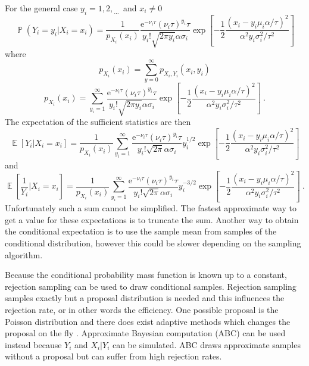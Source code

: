 \documentclass[12pt]{report}
\DeclareMathOperator{\expectation}{\mathbb{E}}
\DeclareMathOperator{\prob}{\mathbb{P}}
\newcommand{\euler}{\mathrm{e}}
\newcommand{\dotdotdot}{_{\phantom{.}\cdots}}
\begin{document}
For the general case $y_i=1,2,\dotdotdot$ and $x_i\neq0$
\begin{equation}
\prob\left(Y_i=y_i|X_i=x_i\right)=\frac{1}{p_{X_i}(x_i)}\dfrac{\euler^{-\nu_i\tau}(\nu_i\tau)^{y_i}\tau}{y_i!\sqrt{2\pi y_i}\alpha\sigma_i}
\exp\left[-\dfrac{1}{2}\dfrac{\left(x_i-y_i\mu_i\alpha/\tau\right)^2}{\alpha^2y_i\sigma_i^2/\tau^2}\right]
\end{equation}
where
\begin{equation*}
p_{X_i}(x_i)=\sum_{y=0}^{\infty}p_{X_i,Y_i}(x_i,y_i)
\end{equation*}
\begin{equation}
p_{X_i}(x_i)=\sum_{y_i=1}^{\infty}\dfrac{\euler^{-\nu_i\tau}(\nu_i\tau)^{y_i}\tau}{y_i!\sqrt{2\pi y_i}\alpha\sigma_i}
\exp\left[-\dfrac{1}{2}\dfrac{\left(x_i-y_i\mu_i\alpha/\tau\right)^2}{\alpha^2y_i\sigma_i^2/\tau^2}\right] \ .
\end{equation}
The expectation of the sufficient statistics are then
\begin{equation}
\expectation\left[Y_i|X_i=x_i\right]=
\frac{1}{p_{X_i}(x_i)}
\sum_{y_i=1}^{\infty}\dfrac{\euler^{-\nu_i\tau}(\nu_i\tau)^{y_i}\tau}{y_i!\sqrt{2\pi}\alpha\sigma_i}y_i^{1/2}
\exp\left[-\dfrac{1}{2}\dfrac{\left(x_i-y_i\mu_i\alpha/\tau\right)^2}{\alpha^2y_i\sigma_i^2/\tau^2}\right]
\end{equation}
and
\begin{equation}
\expectation\left[\dfrac{1}{Y_i}|X_i=x_i\right]=
\frac{1}{p_{X_i}(x_i)}
\sum_{y_i=1}^{\infty}\dfrac{\euler^{-\nu_i\tau}(\nu_i\tau)^{y_i}\tau}{y_i!\sqrt{2\pi}\alpha\sigma_i}y_i^{-3/2}
\exp\left[-\dfrac{1}{2}\dfrac{\left(x_i-y_i\mu_i\alpha/\tau\right)^2}{\alpha^2y_i\sigma_i^2/\tau^2}\right] \ .
\end{equation}
Unfortunately such a sum cannot be simplified. The fastest approximate way to get a value for these expectations is to truncate the sum. Another way to obtain the conditional expectation is to use the sample mean from samples of the conditional distribution, however this could be slower depending on the sampling algorithm.

Because the conditional probability mass function is known up to a constant, rejection sampling can be used to draw conditional samples. Rejection sampling samples exactly but a proposal distribution is needed and this influences the rejection rate, or in other words the efficiency. One possible proposal is the Poisson distribution and there does exist adaptive methods which changes the proposal on the fly \cite{casella2004generalized}. Approximate Bayesian computation (ABC) \cite{marin2012approximate} can be used instead because $Y_i$ and $X_i|Y_i$ can be simulated. ABC draws approximate samples without a proposal but can suffer from high rejection rates.
\end{document}
